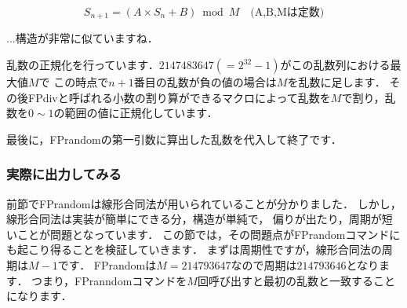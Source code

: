 \[
S_{n+1}=(A\times S_n + B) \bmod M \quad \textrm{(A,B,Mは定数)}
\]

...構造が非常に似ていますね．

乱数の正規化を行っています．$2147483647(=2^{32}-1)$がこの乱数列における最大値$M$で
この時点で$n+1$番目の乱数が負の値の場合は$M$を乱数に足します．
その後FPdivと呼ばれる小数の割り算ができるマクロによって乱数を$M$で割り，乱数を$0\sim 1$の範囲の値に正規化しています．
最後に，FPrandomの第一引数に算出した乱数を代入して終了です．
\subsubsection{実際に出力してみる}
前節でFPrandomは線形合同法が用いられていることが分かりました．
しかし，線形合同法は実装が簡単にできる分，構造が単純で，
偏りが出たり，周期が短いことが問題となっています．
この節では，その問題点がFPrandomコマンドにも起こり得ることを検証していきます．
まずは周期性ですが，線形合同法の周期は$M-1$です．
FPrandomは$M=214793647$なので周期は$214793646$となります．
つまり，FPranndomコマンドを$M$回呼び出すと最初の乱数と一致することになります．
